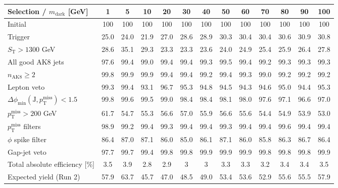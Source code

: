 {\footnotesize\setlength{\tabcolsep}{1.45pt}\renewcommand{\arraystretch}{0.82}%
\begin{tabular}{@{}lcccccccccccc@{}}
\hline
Selection / $m_{\mathrm{dark}}$ [GeV] & 1 & 5 & 10 & 20 & 30 & 40 & 50 & 60 & 70 & 80 & 90 & 100 \\
\hline
Initial & 100 & 100 & 100 & 100 & 100 & 100 & 100 & 100 & 100 & 100 & 100 & 100 \\
Trigger & 25.0 & 24.0 & 21.9 & 27.0 & 28.6 & 28.9 & 30.3 & 30.4 & 30.4 & 30.6 & 30.9 & 30.8 \\
$S_{\mathrm{T}}>1300$ GeV & 28.6 & 35.1 & 29.3 & 23.3 & 23.3 & 23.6 & 24.0 & 24.9 & 25.4 & 25.9 & 26.4 & 27.8 \\
All good AK8 jets & 97.6 & 99.4 & 99.0 & 99.4 & 99.4 & 99.3 & 99.5 & 99.4 & 99.2 & 99.3 & 99.3 & 99.3 \\
$n_{\mathrm{AK8}}\geq 2$ & 99.8 & 99.9 & 99.9 & 99.4 & 99.4 & 99.2 & 99.4 & 99.3 & 99.0 & 99.2 & 99.2 & 99.2 \\
Lepton veto & 99.3 & 99.4 & 93.1 & 96.7 & 95.3 & 94.8 & 94.5 & 94.3 & 94.6 & 95.0 & 94.4 & 95.3 \\
$\Delta\phi_{\min}(\mathrm{J},p_{\mathrm{T}}^{\mathrm{miss}})<1.5$ & 99.8 & 99.6 & 99.5 & 99.0 & 98.4 & 98.4 & 98.1 & 98.0 & 97.6 & 97.1 & 96.6 & 97.0 \\
$p_{\mathrm{T}}^{\mathrm{miss}}>200$ GeV & 61.7 & 54.7 & 55.3 & 56.6 & 57.0 & 55.9 & 56.6 & 55.6 & 54.4 & 54.9 & 53.9 & 53.0 \\
$p_{\mathrm{T}}^{\mathrm{miss}}$ filters & 98.9 & 99.2 & 99.4 & 99.3 & 99.4 & 99.4 & 99.3 & 99.4 & 99.4 & 99.6 & 99.4 & 99.4 \\
$\phi$ spike filter & 86.4 & 87.0 & 87.1 & 86.0 & 85.0 & 86.1 & 87.1 & 86.0 & 85.8 & 86.3 & 86.7 & 86.4 \\
Gap-jet veto & 97.7 & 99.7 & 99.4 & 99.8 & 99.8 & 99.9 & 99.9 & 99.9 & 99.8 & 99.8 & 99.8 & 99.9 \\
\hline
Total absolute efficiency [\%] & 3.5 & 3.9 & 2.8 & 2.9 & 3 & 3 & 3.3 & 3.3 & 3.2 & 3.4 & 3.4 & 3.5 \\
\hline
Expected yield (Run 2) & 57.9 & 63.7 & 45.7 & 47.0 & 48.5 & 49.0 & 53.4 & 53.6 & 52.9 & 55.6 & 55.5 & 57.9 \\
\hline
\end{tabular}%
}
